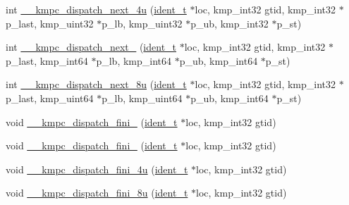 \begin{DoxyCompactItemize}
\item 
int \hyperlink{group__WORK__SHARING_ga9ef4cfec5c836de61180767240c7f380}{\-\_\-\-\_\-kmpc\-\_\-dispatch\-\_\-next\-\_\-4u} (\hyperlink{group__BASIC__TYPES_ga690fda6b92f039a72db263c6b4394ddb}{ident\-\_\-t} $\ast$loc, kmp\-\_\-int32 gtid, kmp\-\_\-int32 $\ast$p\-\_\-last, kmp\-\_\-uint32 $\ast$p\-\_\-lb, kmp\-\_\-uint32 $\ast$p\-\_\-ub, kmp\-\_\-int32 $\ast$p\-\_\-st)
\item 
int \hyperlink{group__WORK__SHARING_gad49ead8c4196b726b6f04d4b1d53d01d}{\-\_\-\-\_\-kmpc\-\_\-dispatch\-\_\-next\-\_} (\hyperlink{group__BASIC__TYPES_ga690fda6b92f039a72db263c6b4394ddb}{ident\-\_\-t} $\ast$loc, kmp\-\_\-int32 gtid, kmp\-\_\-int32 $\ast$p\-\_\-last, kmp\-\_\-int64 $\ast$p\-\_\-lb, kmp\-\_\-int64 $\ast$p\-\_\-ub, kmp\-\_\-int64 $\ast$p\-\_\-st)
\item 
int \hyperlink{group__WORK__SHARING_gab1eac772e1ef6ddc3a8512c00a4e78be}{\-\_\-\-\_\-kmpc\-\_\-dispatch\-\_\-next\-\_\-8u} (\hyperlink{group__BASIC__TYPES_ga690fda6b92f039a72db263c6b4394ddb}{ident\-\_\-t} $\ast$loc, kmp\-\_\-int32 gtid, kmp\-\_\-int32 $\ast$p\-\_\-last, kmp\-\_\-uint64 $\ast$p\-\_\-lb, kmp\-\_\-uint64 $\ast$p\-\_\-ub, kmp\-\_\-int64 $\ast$p\-\_\-st)
\item 
void \hyperlink{group__WORK__SHARING_ga5f02c0e2081859da86664bfeaec6de62}{\-\_\-\-\_\-kmpc\-\_\-dispatch\-\_\-fini\-\_} (\hyperlink{group__BASIC__TYPES_ga690fda6b92f039a72db263c6b4394ddb}{ident\-\_\-t} $\ast$loc, kmp\-\_\-int32 gtid)
\item 
void \hyperlink{group__WORK__SHARING_gac9f8cad27477155b583b54848887997d}{\-\_\-\-\_\-kmpc\-\_\-dispatch\-\_\-fini\-\_} (\hyperlink{group__BASIC__TYPES_ga690fda6b92f039a72db263c6b4394ddb}{ident\-\_\-t} $\ast$loc, kmp\-\_\-int32 gtid)
\item 
void \hyperlink{group__WORK__SHARING_gaf293aeef6b6f673f2d824171d6ec20e3}{\-\_\-\-\_\-kmpc\-\_\-dispatch\-\_\-fini\-\_\-4u} (\hyperlink{group__BASIC__TYPES_ga690fda6b92f039a72db263c6b4394ddb}{ident\-\_\-t} $\ast$loc, kmp\-\_\-int32 gtid)
\item 
void \hyperlink{group__WORK__SHARING_gad99af80b23202044e80aaed7d711b9ac}{\-\_\-\-\_\-kmpc\-\_\-dispatch\-\_\-fini\-\_\-8u} (\hyperlink{group__BASIC__TYPES_ga690fda6b92f039a72db263c6b4394ddb}{ident\-\_\-t} $\ast$loc, kmp\-\_\-int32 gtid)
\end{DoxyCompactItemize}
